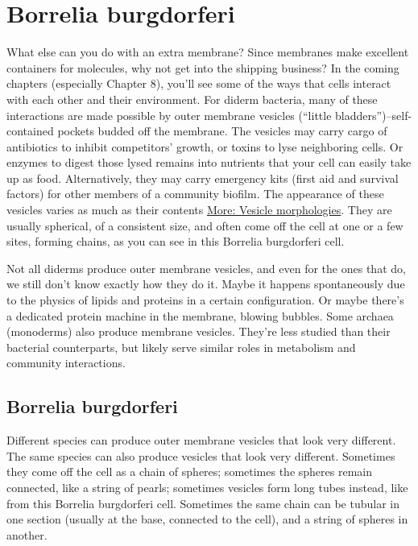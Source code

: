 \documentclass[]{tufte-book}
\begin{document}
\hypertarget{borrelia-burgdorferi}{%
\section{Borrelia burgdorferi}\label{borrelia-burgdorferi}}

What else can you do with an extra membrane? Since membranes make excellent containers for molecules, why not get into the shipping business? In the coming chapters (especially Chapter 8), you'll see some of the ways that cells interact with each other and their environment. For diderm bacteria, many of these interactions are made possible by outer membrane vesicles (``little bladders'')--self-contained pockets budded off the membrane. The vesicles may carry cargo of antibiotics to inhibit competitors' growth, or toxins to lyse neighboring cells. Or enzymes to digest those lysed remains into nutrients that your cell can easily take up as food. Alternatively, they may carry emergency kits (first aid and survival factors) for other members of a community biofilm. The appearance of these vesicles varies as much as their contents \protect\hyperlink{Vesicle_morphologies}{More: Vesicle morphologies}. They are usually spherical, of a consistent size, and often come off the cell at one or a few sites, forming chains, as you can see in this Borrelia burgdorferi cell.

Not all diderms produce outer membrane vesicles, and even for the ones that do, we still don't know exactly how they do it. Maybe it happens spontaneously due to the physics of lipids and proteins in a certain configuration. Or maybe there's a dedicated protein machine in the membrane, blowing bubbles. Some archaea (monoderms) also produce membrane vesicles. They're less studied than their bacterial counterparts, but likely serve similar roles in metabolism and community interactions.

\hypertarget{htmlwidget-00bc014cab08e18a328f}{}

\hypertarget{Vesicle_morphologies}{%
\subsection{Borrelia burgdorferi}\label{Vesicle_morphologies}}

Different species can produce outer membrane vesicles that look very different. The same species can also produce vesicles that look very different. Sometimes they come off the cell as a chain of spheres; sometimes the spheres remain connected, like a string of pearls; sometimes vesicles form long tubes instead, like from this Borrelia burgdorferi cell. Sometimes the same chain can be tubular in one section (usually at the base, connected to the cell), and a string of spheres in another.
\end{document}
